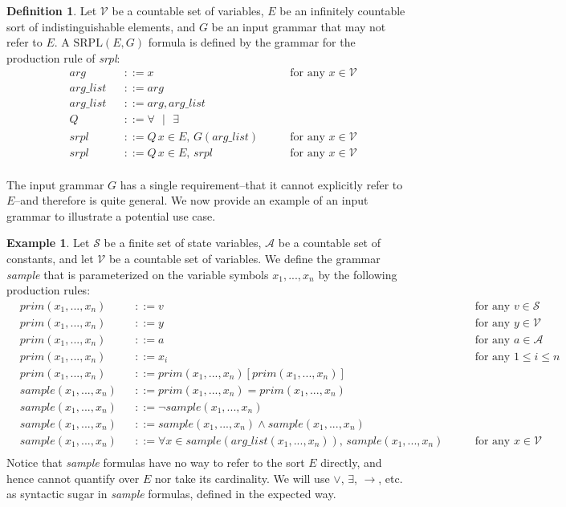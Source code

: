 \documentclass[12pt]{article}
\theoremstyle{definition}
\newtheorem{definition}{Definition}
\newtheorem{example}{Example}
\theoremstyle{remark}
\newcommand{\st}{\text{ }|\text{ }}
\newcommand{\SRPL}{\text{SRPL}}
\begin{document}
\begin{definition}
  Let $\mathcal{V}$ be a countable set of variables, $E$ be an infinitely countable sort of indistinguishable elements, and $G$ be an input grammar that may not refer to $E$.  A $\SRPL(E,G)$ formula is defined by the grammar for the production rule of \textit{srpl}:
  \begin{align*}
    &arg& &::= x \qquad &\text{for any } x \in \mathcal{V}\\
    &arg\_list& &::= arg\\
    &arg\_list& &::= arg,arg\_list\\
    &Q& &::= \forall \st \exists\\
    &srpl& &::= Q \, x \in E, \, G(arg\_list) \qquad &\text{for any } x \in \mathcal{V}\\
    &srpl& &::= Q \, x \in E, \, srpl \qquad &\text{for any } x \in \mathcal{V}\\
  \end{align*}
\end{definition}

The input grammar $G$ has a single requirement--that it cannot explicitly refer to $E$--and therefore is quite general.  We now provide an example of an input grammar to illustrate a potential use case.

\begin{example}
  Let $\mathcal{S}$ be a finite set of state variables, $\mathcal{A}$ be a countable set of constants, and let $\mathcal{V}$ be a countable set of variables.  We define the grammar \textit{sample} that is parameterized on the variable symbols $x_1,...,x_n$ by the following production rules:
  \begin{align*}
    &prim(x_1,...,x_n)& &::= v \qquad &\text{for any } v \in \mathcal{S}\\
    &prim(x_1,...,x_n)& &::= y \qquad &\text{for any } y \in \mathcal{V}\\
    &prim(x_1,...,x_n)& &::= a \qquad &\text{for any } a \in \mathcal{A}\\
    &prim(x_1,...,x_n)& &::= x_i \qquad &\text{for any } 1 \leq i \leq n\\
    &prim(x_1,...,x_n)& &::= prim(x_1,...,x_n)[prim(x_1,...,x_n)]\\
    &sample(x_1,...,x_n)& &::= prim(x_1,...,x_n) = prim(x_1,...,x_n)\\
    &sample(x_1,...,x_n)& &::= \neg sample(x_1,...,x_n)\\
    &sample(x_1,...,x_n)& &::= sample(x_1,...,x_n) \land sample(x_1,...,x_n)\\
    &sample(x_1,...,x_n)& &::= \forall x \in sample(arg\_list(x_1,...,x_n)), \, sample(x_1,...,x_n) \qquad &\text{for any } x \in \mathcal{V}\\
  \end{align*}
  Notice that \textit{sample} formulas have no way to refer to the sort $E$ directly, and hence cannot quantify over $E$ nor take its cardinality.  We will use $\lor$, $\exists$, $\rightarrow$, etc. as syntactic sugar in \textit{sample} formulas, defined in the expected way.
\end{example}
\end{document}
